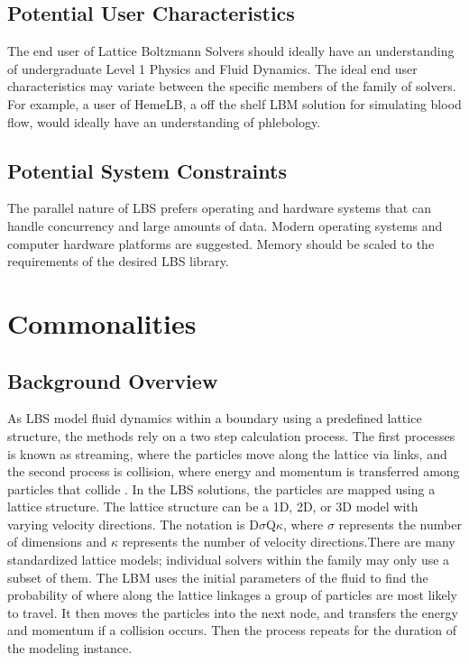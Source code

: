 \documentclass[12pt]{article}
\newcommand{\famname}{Lattice Boltzmann Solvers} %
\begin{document}
\subsection{Potential User Characteristics} \label{SecUserCharacteristics}

The end user of \famname{} should ideally have an understanding of undergraduate Level 1 Physics and Fluid Dynamics. The ideal end user characteristics may variate between the specific members of the family of solvers. For example, a user of HemeLB, a off the shelf LBM solution for simulating blood flow, would ideally have an understanding of phlebology.

\subsection{Potential System Constraints}

The parallel nature of LBS prefers operating and hardware systems that can handle concurrency and large amounts of data. Modern operating systems and computer hardware platforms are suggested. Memory should be scaled to the requirements of the desired LBS library.

\section{Commonalities}

\subsection{Background Overview} \label{Sec_Background}

As LBS model fluid dynamics within a boundary using a predefined lattice structure, the methods rely on a two step calculation process. The first processes is known as streaming, where the particles move along the lattice via links, and the second process is collision, where energy and momentum is transferred among particles that collide \cite{bao2011lattice}.
In the LBS solutions, the particles are mapped using a lattice structure. The lattice structure can be a 1D, 2D, or 3D model with varying velocity directions. The notation is D$\sigma$Q$\kappa$, where $\sigma$ represents the number of dimensions and $\kappa$ represents the number of velocity directions.There are many standardized lattice models; individual solvers within the family may only use a subset of them.
The LBM uses the initial parameters of the fluid to find the probability of where along the lattice linkages a group of particles are most likely to travel. It then moves the particles into the next node, and transfers the energy and momentum if a collision occurs. Then the process repeats for the duration of the modeling instance.
\end{document}
